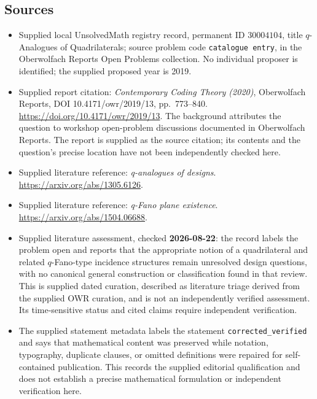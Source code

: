 \documentclass[11pt]{article}
\begin{document}
\subsection{Sources}
\begin{itemize}
\item Supplied local UnsolvedMath registry record, permanent ID \(30004104\), title \(q\)-Analogues of Quadrilaterals; source problem code \texttt{catalogue entry}, in the Oberwolfach Reports Open Problems collection. No individual proposer is identified; the supplied proposed year is 2019.
\item Supplied report citation: \emph{Contemporary Coding Theory (2020)}, Oberwolfach Reports, DOI 10.4171/owr/2019/13, pp.\ 773--840. \url{https://doi.org/10.4171/owr/2019/13}. The background attributes the question to workshop open-problem discussions documented in Oberwolfach Reports. The report is supplied as the source citation; its contents and the question's precise location have not been independently checked here.
\item Supplied literature reference: \emph{q-analogues of designs}. \url{https://arxiv.org/abs/1305.6126}.
\item Supplied literature reference: \emph{q-Fano plane existence}. \url{https://arxiv.org/abs/1504.06688}.
\item Supplied literature assessment, checked \textbf{2026-08-22}: the record labels the problem open and reports that the appropriate notion of a quadrilateral and related \(q\)-Fano-type incidence structures remain unresolved design questions, with no canonical general construction or classification found in that review. This is supplied dated curation, described as literature triage derived from the supplied OWR curation, and is not an independently verified assessment. Its time-sensitive status and cited claims require independent verification.
\item The supplied statement metadata labels the statement \texttt{corrected\_verified} and says that mathematical content was preserved while notation, typography, duplicate clauses, or omitted definitions were repaired for self-contained publication. This records the supplied editorial qualification and does not establish a precise mathematical formulation or independent verification here.
\end{itemize}
\end{document}
